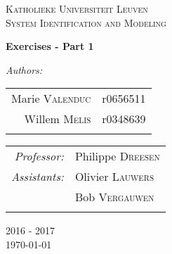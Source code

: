 \begin{titlepage}
\begin{center}

\vfill


\textsc{\LARGE Katholieke Universiteit Leuven}\\[0.7cm]

\textsc{\Large System Identification and Modeling}\\[0.7cm]

\begin{mdframed}[backgroundcolor=none,fontcolor=black,innerbottommargin=0.7cm, innertopmargin=0.6cm, linewidth=2pt]
    \centering \huge \bfseries Exercises - Part 1 
\end{mdframed}

\end{center}

\vfill

\begin{center}
\emph{Authors:} \\[.2cm]
\begin{tabular}[h]{rl}
Marie \textsc{Valenduc} & r0656511\\
Willem \textsc{Melis} & r0348639\\
\phantom{------------------------} & \phantom{------------------------}\\
\end{tabular}
\end{center}

\vfill

\begin{center}
\begin{tabular}[h]{rl}
\emph{Professor:} & Philippe \textsc{Dreesen}\\
\emph{Assistants:}&  Olivier \textsc{Lauwers} \\
&  Bob \textsc{Vergauwen} \\
\phantom{------------------------} & \phantom{------------------------}\\
\end{tabular}
\end{center}

\vfill
\vfill
\vfill

\begin{center} 
2016 - 2017 \\[.5cm]
{\Large \today}
\end{center}

\end{titlepage}